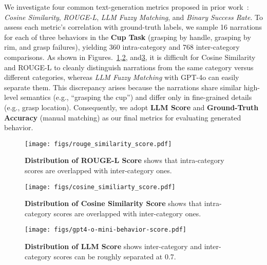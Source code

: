We investigate four common text-generation metrics proposed in prior work~\citep{duanaha}: \textit{Cosine Similarity}, \textit{ROUGE-L}, \textit{LLM Fuzzy Matching}, and \textit{Binary Success Rate}. To assess each metric’s correlation with ground-truth labels, we sample 16 narrations for each of three behaviors in the \textbf{Cup Task} (grasping by handle, grasping by rim, and grasp failures), yielding 360 intra-category and 768 inter-category comparisons. As shown in Figures.~\ref{fig:rouge_score},\ref{fig:cosine_score}, and\ref{fig:llm_score}, it is difficult for Cosine Similarity and ROUGE-L to cleanly distinguish narrations from the same category versus different categories, whereas \textit{LLM Fuzzy Matching} with GPT-4o can easily separate them. This discrepancy arises because the narrations share similar high-level semantics (e.g., “grasping the cup”) and differ only in fine-grained details (e.g., grasp location). Consequently, we adopt \textbf{LLM Score} and \textbf{Ground-Truth Accuracy} (manual matching) as our final metrics for evaluating generated behavior.
   \begin{figure}[h!]
   \vspace{-0.3cm}
    \centering
    \texttt{[image: figs/rouge\_similarity\_score.pdf]}
    \caption{\textbf{Distribution of ROUGE-L Score} shows that intra-category scores are overlapped with inter-category ones.}
    \label{fig:rouge_score}
    \vspace{-0.3cm}
\end{figure}
\begin{figure}[h!]
\vspace{-0.5cm}
    \centering
    \texttt{[image: figs/cosine\_similiarty\_score.pdf]}
    \caption{\textbf{Distribution of Cosine Similarity Score} shows that intra-category scores are overlapped with inter-category ones.}
    \label{fig:cosine_score}
    \vspace{-0.4cm}
\end{figure}
\begin{figure}[h!]
    \centering
    \vspace{-0.3cm}
    \texttt{[image: figs/gpt4-o-mini-behavior-score.pdf]}
    \caption{\textbf{Distribution of LLM Score} shows inter-category  and inter-category scores can be roughly separated at 0.7.}
    \label{fig:llm_score}
\end{figure}





